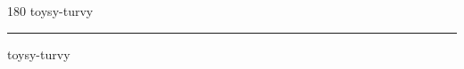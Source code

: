 
\begin{frame}
\begin{center}
\begin{turn}{180}
{\fontsize{2.5cm}{1em}\selectfont toysy-turvy}
\end{turn}
\vspace{1em}\par  
\hrule
\vspace{1em}\par  
{\fontsize{2.5cm}{1em}\selectfont toysy-turvy}
\end{center}
\end{frame}
